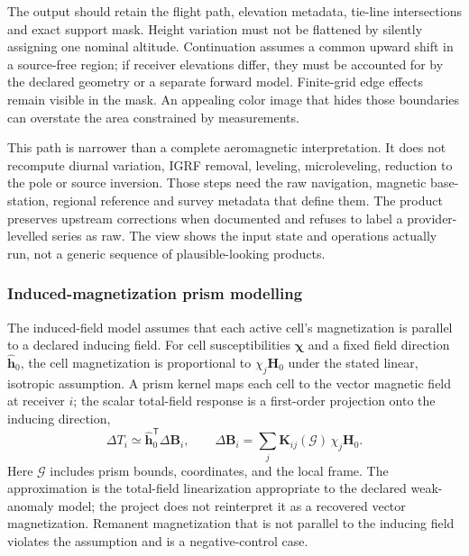 The output should retain the flight path, elevation metadata, tie-line
intersections and exact support mask. Height variation must not be
flattened by silently assigning one nominal altitude. Continuation
assumes a common upward shift in a source-free region; if receiver
elevations differ, they must be accounted for by the declared geometry
or a separate forward model. Finite-grid edge effects remain visible in
the mask. An appealing color image that hides those boundaries can
overstate the area constrained by measurements.

This path is narrower than a complete aeromagnetic interpretation. It
does not recompute diurnal variation, IGRF removal, leveling,
microleveling, reduction to the pole or source inversion. Those steps
need the raw navigation, magnetic base-station, regional reference and
survey metadata that define them. The product preserves upstream
corrections when documented and refuses to label a provider-levelled
series as raw. The view shows the input state and operations actually
run, not a generic sequence of plausible-looking products.

\subsubsection{Induced-magnetization prism modelling}
\label{method-induced-magnetics}

The induced-field model assumes that each active cell's magnetization
is parallel to a declared inducing field. For cell susceptibilities
$\boldsymbol{\chi}$ and a fixed field direction $\hat{\mathbf{h}}_0$,
the cell magnetization is proportional to $\chi_j\mathbf{H}_0$ under
the stated linear, isotropic assumption. A prism kernel maps each cell
to the vector magnetic field at receiver $i$; the scalar total-field
response is a first-order projection onto the inducing direction,
\begin{equation}
  \Delta T_i \simeq \hat{\mathbf{h}}_0^{\mathsf T}\Delta\mathbf{B}_i,
  \qquad
  \Delta\mathbf{B}_i = \sum_j \mathbf{K}_{ij}(\mathcal{G})\,\chi_j\mathbf{H}_0.
  \label{eq:magnetic-prism-forward}
\end{equation}
Here $\mathcal{G}$ includes prism bounds, coordinates, and the local
frame. The approximation is the total-field linearization appropriate
to the declared weak-anomaly model; the project does not reinterpret it
as a recovered vector magnetization. Remanent magnetization that is
not parallel to the inducing field violates the assumption and is a
negative-control case.

